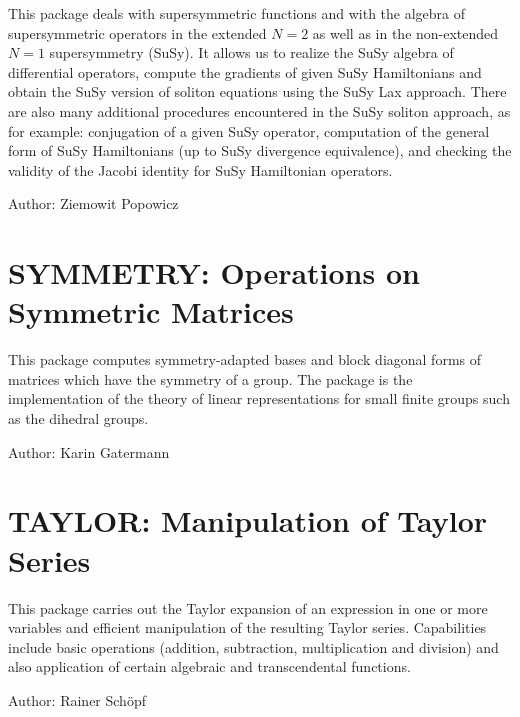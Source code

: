 This package deals with supersymmetric functions and with the algebra
of supersymmetric operators in the extended $N=2$ as well as in the
non-extended $N=1$ supersymmetry (SuSy).  It allows us to realize the
SuSy algebra of differential operators, compute the gradients of given
SuSy Hamiltonians and obtain the SuSy version of soliton equations
using the SuSy Lax approach.  There are also many additional
procedures encountered in the SuSy soliton approach, as for example:
conjugation of a given SuSy operator, computation of the general form
of SuSy Hamiltonians (up to SuSy divergence equivalence), and checking
the validity of the Jacobi identity for SuSy Hamiltonian operators.

Author: Ziemowit Popowicz



\newpage

\section{SYMMETRY: Operations on Symmetric Matrices}
\label{package:SYMMETRY}

This package computes symmetry-adapted bases and block diagonal forms of
matrices which have the symmetry of a group.  The package is the
implementation of the theory of linear representations for small finite
groups such as the dihedral groups.

Author: Karin Gatermann



\newpage

\iffalse
\section{TAYLOR: Manipulation of Taylor Series}

 

This package carries out the Taylor expansion of an expression in one or
more variables and efficient manipulation of the resulting Taylor series.
Capabilities include basic operations (addition, subtraction,
multiplication and division) and also application of certain algebraic and
transcendental functions.

Author: Rainer Sch\"opf



\newpage

